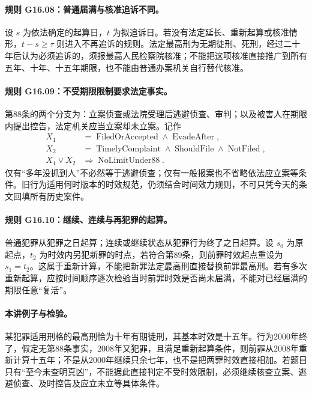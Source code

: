 \paragraph{规则 G16.08：普通届满与核准追诉不同。}
设 $s$ 为依法确定的起算日，$t$ 为拟追诉日。若没有法定延长、重新起算或核准情形，$t-s\ge\tau$ 则进入不再追诉的规则。法定最高刑为无期徒刑、死刑，经过二十年后认为必须追诉的，须报最高人民检察院核准；不能把这项核准直接推广到所有五年、十年、十五年期限，也不能由普通办案机关自行替代核准。

\paragraph{规则 G16.09：不受期限限制要求法定事实。}
第88条的两个分支为：立案侦查或法院受理后逃避侦查、审判；以及被害人在期限内提出控告，法定机关应当立案却未立案。记作
\[
\begin{aligned}
X_1&=\operatorname{FiledOrAccepted}\land\operatorname{EvadeAfter},\\
X_2&=\operatorname{TimelyComplaint}\land\operatorname{ShouldFile}\land\operatorname{NotFiled},\\
X_1\lor X_2&\Longrightarrow\operatorname{NoLimitUnder88}.
\end{aligned}
\]
仅有“多年没抓到人”不必然等于逃避侦查；仅有一般报案也不省略依法应立案等条件。旧行为适用何时版本的时效规范，仍须结合时间效力规则，不可只凭今天的条文回填所有历史案件。

\paragraph{规则 G16.10：继续、连续与再犯罪的起算。}
普通犯罪从犯罪之日起算；连续或继续状态从犯罪行为终了之日起算。设 $s_0$ 为原起点，$t_2$ 为时效内另犯新罪的时点，若符合第89条，则前罪时效起点重设为 $s_1=t_2$。这属于重新计算，不能把新罪法定最高刑直接替换前罪最高刑。若有多次重新起算，应按时间顺序逐次检验当时前罪时效是否尚未届满，不能对已经届满的期限任意“复活”。

\paragraph{本讲例子与检验。}
某犯罪适用刑格的最高刑恰为十年有期徒刑，其基本时效是十五年。行为2000年终了，假定无第88条事实，2008年又犯罪，且满足重新起算条件，则前罪从2008年重新计算十五年；不是从2000年继续只余七年，也不是把两罪时效直接相加。若题目只有“至今未查明真凶”，不能据此直接判定不受时效限制，必须继续核查立案、逃避侦查、及时控告及应立未立等具体条件。


